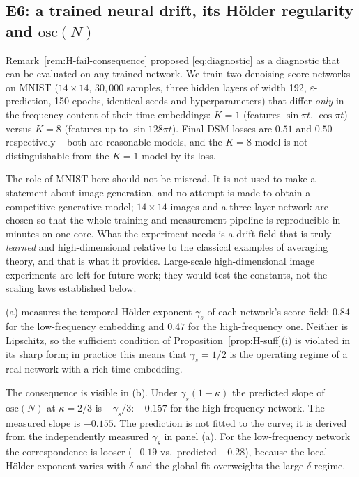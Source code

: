 \documentclass[a4paper,fleqn]{cas-dc}
\theoremstyle{definition}
\begin{document}


\subsection{E6: a trained neural drift, its H\"older regularity and $\mathrm{osc}(N)$}
\label{sec:exp-e6}

Remark~\ref{rem:H-fail-consequence} proposed \eqref{eq:diagnostic} as a diagnostic
that can be evaluated on any trained network. We train two denoising score
networks on MNIST ($14\times14$, $30{,}000$ samples, three hidden layers of
width 192, $\varepsilon$-prediction, 150 epochs, identical seeds and
hyperparameters) that differ \emph{only} in the frequency content of their time
embeddings: $K=1$ (features $\sin\pi t$, $\cos\pi t$) versus $K=8$ (features up
to $\sin 128\pi t$). Final DSM losses are $0.51$ and $0.50$
respectively -- both are reasonable models, and the $K=8$ model is not distinguishable
from the $K=1$ model by its loss.

The role of MNIST here should not be misread. It is not used to make a statement about
image generation, and no attempt is made to obtain a competitive generative model;
$14\times14$ images and a three-layer network are chosen so that the whole
training-and-measurement pipeline is reproducible in minutes on one core. What the
experiment needs is a drift field that is truly \emph{learned} and
high-dimensional relative to the classical examples of averaging theory, and that is
what it provides. Large-scale high-dimensional image experiments are left for future
work; they would test the constants, not the scaling laws established below.

(a) measures the temporal H\"older exponent $\gamma_{s}$ of each
network's score field: $0.84$ for the low-frequency embedding and $0.47$ for
the high-frequency one. Neither is Lipschitz, so the sufficient condition of
Proposition~\ref{prop:H-suff}(i) is violated in its sharp form; in practice this means that
$\gamma_{s}=1/2$ is the operating regime of a real network with a rich time
embedding.

The consequence is visible in (b). Under
$\gamma_{s}(1-\kappa)$ the predicted slope of $\mathrm{osc}(N)$ at
$\kappa=2/3$ is $-\gamma_{s}/3$: $-0.157$ for the high-frequency network. The
measured slope is $-0.155$. The prediction is not fitted to the curve; it is derived from the independently measured $\gamma_{s}$
in panel (a). For the low-frequency network the correspondence is looser
($-0.19$ vs.\ predicted $-0.28$), because the local H\"older exponent varies
with $\delta$ and the global fit overweights the large-$\delta$ regime.
\end{document}
